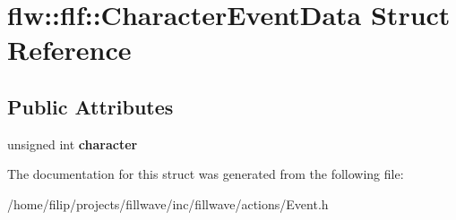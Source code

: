 \hypertarget{structflw_1_1flf_1_1CharacterEventData}{}\section{flw\+:\+:flf\+:\+:Character\+Event\+Data Struct Reference}
\label{structflw_1_1flf_1_1CharacterEventData}
\subsection*{Public Attributes}
\begin{DoxyCompactItemize}
\item 
\mbox{\label{structflw_1_1flf_1_1CharacterEventData_a66078927332efbd386b6f0a4fb767d38}} 
unsigned int {\bfseries character}
\end{DoxyCompactItemize}


The documentation for this struct was generated from the following file\+:\begin{DoxyCompactItemize}
\item 
/home/filip/projects/fillwave/inc/fillwave/actions/Event.\+h\end{DoxyCompactItemize}
